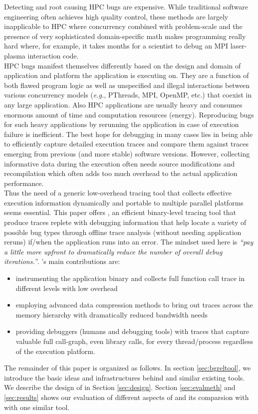 
Detecting and root causing HPC bugs are expensive. While traditional software engineering often achieves high quality control, these methods are largely inapplicable to HPC where concurrency combined with problem-scale and the presence of very sophisticated domain-specific math makes programming really hard where, for example,  it takes months for a scientist to debug an MPI laser-plasma interaction code\cite{hpcdoe}.\\
HPC bugs manifest themselves differently based on the design and domain of application and platform the application is executing on. They are a function of both flawed program logic as well as unspecified and illegal interactions between various concurrency models ({\em e.g.}, PThreads, MPI, OpenMP, etc.) that coexist in any large application. Also HPC applications are usually heavy and consumes enormous amount of time and computation resources (energy). Reproducing bugs for such heavy applications by rerunning the application in case of execution failure is inefficient. The best hope for debugging in many cases lies in being able to efficiently capture detailed execution traces and compare them against traces emerging from previous (and more stable) software versions\cite{cstg}\cite{stat}. However, collecting informative data during the execution often needs source modifications and recompilation which often adds too much overhead to the actual application performance. \\
Thus the need of a generic low-overhead tracing tool that collects effective execution information dynamically and portable to multiple parallel platforms seems essential.
This paper offers \parlot, an efficient binary-level tracing tool that produce traces replete with debugging information that help locate a variety of possible bug types through offline trace analysis (without needing application reruns) if/when the application runs into an error. The mindset used here is \textit{“pay a little more upfront to dramatically reduce the number of overall debug iterations.”}. \parlot 's main contributions are:
\begin{itemize}
\item instrumenting the application binary and collects full function call trace in different levels with low overhead
\item employing advanced data compression methods to bring out traces across the memory hierarchy with dramatically reduced bandwidth needs
\item providing debuggers (humans and debugging tools) with traces that capture valuable full call-graph, even library calls, for every thread/process regardless of the execution platform.
\end{itemize}
The remainder of this paper is organized as follows. In section \ref{sec:bgreltool}, we introduce the basic ideas and infrastructures behind \parlot and similar existing tools. We describe the design of \parlot in Section \ref{sec:design}. Section \ref{sec:evalmeth} and \ref{sec:results} shows our evaluation of different aspects of \parlot and its comparsion with with one similar tool.

